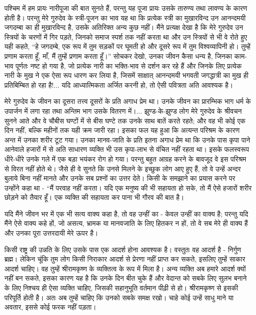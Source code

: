 पश्चिम में हम प्रायः नारीपूजा की बात सुनते हैं, परन्तु यह पूजा प्रायः उसके तारुण्य तथा लावण्य के कारण होती है। परन्तु मेरे गुरुदेव के स्त्री-पूजन का भाव यह था कि प्रत्येक स्त्री का मुखारविन्द उन आनन्दमयी जगदम्बा का ही मुखारविन्द है, उसके अतिरिक्त अन्य कुछ नहीं। मैंने प्रत्यक्ष देखा है कि मेरे गुरुदेव उन स्त्रियों के चरणों में गिर पड़ते, जिनको समाज स्पर्श तक नहीं करता था और उन स्त्रियों से भी वे रोते हुए यही कहते, “हे जगदम्बे, एक रूप में तुम सड़कों पर घूमती हो और दूसरे रूप में तुम विश्वव्यापिनी हो। तुम्हें प्रणाम करता हूँ, माँ, मैं तुम्हें प्रणाम करता हूँ।” सोचकर देखो, उनका जीवन कैसा धन्य है, जिनका काम-भाव पूर्णतः नष्ट हो गया है, जो प्रत्येक नारी का भक्ति-भाव से दर्शन कर रहे हैं और जिनके लिए प्रत्येक नारी के मुख ने एक ऐसा रूप धारण कर लिया है, जिसमें साक्षात् आनन्दमयी भगवती जगद्धात्री का मुख ही प्रतिबिम्बित हो रहा है!... यदि आध्यात्मिकता अर्जित करनी हो, तो ऐसी पवित्रता अति आवश्यक है। 

मेरे गुरुदेव के जीवन का दूसरा तत्त्व दूसरों के प्रति अगाध प्रेम था। उनके जीवन का प्रारम्भिक भाग धर्म के उपार्जन में लगा रहा तथा अन्तिम भाग उसके वितरण में।... झुण्ड-के-झुण्ड लोग मेरे गुरुदेव के श्रीवचन सुनने आते और वे चौबीस घण्टों में से बीस घण्टे तक उनके साथ बातें करते रहते; और वह भी कोई एक दिन नहीं, बल्कि महीनों तक यही क्रम जारी रहा। इसका फल यह हुआ कि अत्यन्त परिश्रम के कारण अन्त में उनका शरीर टूट गया। उनका मानव-जाति के प्रति इतना अगाध प्रेम था कि उनके पास कृपा पाने आनेवाले हजारों में से अति साधारण व्यक्ति भी उस कृपा-लाभ से वंचित नहीं रहता था। इसके फलस्वरूप धीरे-धीरे उनके गले में एक बड़ा भयंकर रोग हो गया। परन्तु बहुत आग्रह करने के बावजूद वे इस परिश्रम से विरत नहीं होते थे। जैसे ही वे सुनते कि उनसे मिलने के इच्छुक लोग आए हुए हैं, तो वे उन्हें अन्दर बुलाये बिना नहीं मानते और उनके सब प्रश्नों का उत्तर देते। किसी के समझाने का प्रयास करने पर उन्होंने कहा था - “मैं परवाह नहीं करता। यदि एक मनुष्य की भी सहायता हो सके, तो मैं ऐसे हजारों शरीर छोड़ने को तैयार हूँ। एक व्यक्ति की सहायता कर पाना भी गौरव की बात है। 

यदि मैंने जीवन भर में एक भी सत्य वाक्य कहा है, तो वह उन्हीं का - केवल उन्हीं का वाक्य है; परन्तु यदि मैंने ऐसे वाक्य कहे हों, जो असत्य, भ्रामक या मानवजाति के लिए हितकर न हों, तो वे सब मेरे ही वाक्य हैं और उनका पूरा उत्तरदायी मेरे ऊपर है। 

किसी राष्ट्र की उन्नति के लिए उसके पास एक आदर्श होना आवश्यक है। वस्तुतः वह आदर्श है - निर्गुण ब्रह्म। लेकिन चूंकि तुम लोग किसी निराकार आदर्श से प्रेरणा नहीं प्राप्त कर सकते, इसलिए तुम्हें साकार आदर्श चाहिए। वह तुम्हें श्रीरामकृष्ण के व्यक्तित्व के रूप में मिला है। अन्य व्यक्ति अब हमारे आदर्श क्यों नहीं बन सकते, इसका कारण यह है कि उनके दिन बीत चुके हैं और वेदान्त को सबके लिए सुलभ बनाने के लिए निश्चय ही ऐसा व्यक्ति चाहिए, जिसकी सहानुभूति वर्तमान पीढ़ी से हो। श्रीरामकृष्ण से इसकी परिपूर्ति होती है। अतः अब तुम्हें चाहिए कि उनको सबके समक्ष रखो। चाहे कोई उन्हें साधु माने या अवतार, इससे कोई फरक नहीं पड़ता। 

